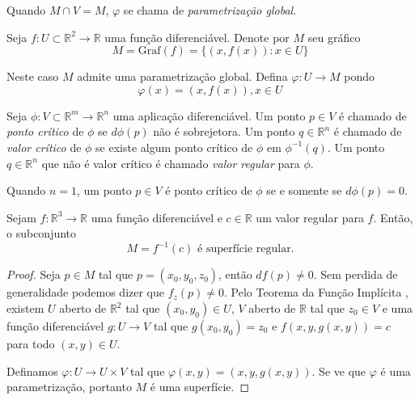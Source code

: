 \begin{obse}
	Quando $M \cap V = M$, $\varphi$ se chama de \emph{parametrização global}.
\end{obse}

\begin{exemplo}
Seja $f: U \subset \mathbb{R}^2 \rightarrow \mathbb{R}$ uma função diferenciável. Denote por $M$ seu gráfico
\begin{equation*}
    M = \text{Graf}(f) = \{ (x,f(x)): x \in U \}
\end{equation*}

Neste caso $M$ admite uma parametrização global. Defina $\varphi: U \rightarrow M$ pondo
\begin{equation*}
    \varphi(x) = (x,f(x)), x \in U
\end{equation*}
\end{exemplo}

\begin{defi}
Seja $\phi: V \subset \mathbb{R}^m \rightarrow \mathbb{R}^n$ uma aplicação diferenciável. Um ponto $p \in V$ é chamado de \emph{ponto crítico} de $\phi$ se $d\phi(p)$ não é sobrejetora. Um ponto $q \in \mathbb{R}^n$ é chamado de \emph{valor crítico} de $\phi$ se existe algum ponto crítico de $\phi$ em $\phi^{-1}(q)$. Um ponto $q \in \mathbb{R}^n$ que não é valor crítico é chamado \emph{valor regular} para $\phi$.
\end{defi}

\begin{obse}
Quando $n=1$, um ponto $p \in V$ é ponto crítico de $\phi$ se e somente se $d\phi(p)=0$.
\end{obse}

\begin{teo}\label{preimagem_de_um_valor_regular}
Sejam $f: \mathbb{R}^3 \rightarrow \mathbb{R}$ uma função diferenciável e $c \in \mathbb{R}$ um valor regular para $f$. Então, o subconjunto
\begin{equation*}
    M = f^{-1}(c) \text{ é superfície regular.}
\end{equation*}
\end{teo}

\begin{proof}
Seja $p \in M$ tal que $p=(x_0,y_0,z_0)$, então $df(p) \neq 0$. Sem perdida de generalidade podemos dizer que $f_z(p) \neq 0$. Pelo Teorema da Função Implícita \cite[p.~296]{lima1985} \cite[p.~36]{montiel2009}, existem $U$ aberto de $\mathbb{R}^2$ tal que $(x_0,y_0) \in U$, $V$ aberto de $\mathbb{R}$ tal que $z_0 \in V$ e uma função diferenciável $g: U \rightarrow V$ tal que $g(x_0,y_0)=z_0$ e $f(x,y,g(x,y)) = c$ para todo $(x,y) \in U$.

Definamos $\varphi: U \rightarrow U \times V$ tal que $\varphi(x,y) = (x,y,g(x,y))$. Se ve que $\varphi$ é uma parametrização, portanto $M$ é uma superfície.
\end{proof}

